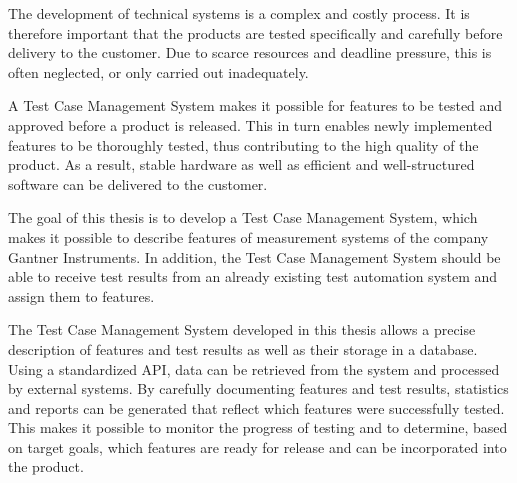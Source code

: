 \documentclass[a4paper, fontsize=11pt, parskip=half, twoside, headings=openright]{scrreprt}
\begin{document}
	The development of technical systems is a complex and costly process. 
	It is therefore important that the products are tested specifically and carefully before delivery to the customer. 
	Due to scarce resources and deadline pressure, this is often neglected, or only carried out inadequately. 
	
	A Test Case Management System makes it possible for features to be tested and approved before a product is released. 
	This in turn enables newly implemented features to be thoroughly tested, thus contributing to the high quality of the product.
	As a result, stable hardware as well as efficient and well-structured software can be delivered to the customer.
	
	The goal of this thesis is to develop a Test Case Management System, which makes it possible to describe features of measurement systems of the company Gantner Instruments.
	In addition, the Test Case Management System should be able to receive test results from an already existing test automation system and assign them to features.
	
	The Test Case Management System developed in this thesis allows a precise description of features and test results as well as their storage in a database. 
	Using a standardized API, data can be retrieved from the system and processed by external systems. 
	By carefully documenting features and test results, statistics and reports can be generated that reflect which features were successfully tested.
	This makes it possible to monitor the progress of testing and to determine, based on target goals, which features are ready for release and can be incorporated into the product.
	
	\cleardoublepage   %
	\setcounter{tocdepth}{2}
	\setcounter{secnumdepth}{4}
	\tableofcontents
	
	\clearpage
	\listoffigures
	
	\clearpage
	\listoflistings
	
	\clearpage
\end{document}
